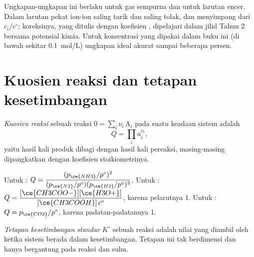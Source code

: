\begin{remark}\label{rem:b1:extent-q-and-k:ideal}
Ungkapan-ungkapan ini berlaku untuk gas sempurna dan untuk larutan encer.
Dalam larutan pekat ion-ion saling tarik dan saling tolak, dan
 menyimpang dari $c_i/c^\circ$; koreksinya, yang ditulis
dengan koefisien , dipelajari dalam jilid Tahun 2 bersama
potensial kimia. Untuk konsentrasi yang dipakai dalam buku ini (di bawah
sekitar \qty{0.1}{mol/L}) ungkapan ideal akurat sampai beberapa persen.
\end{remark}

\section{Kuosien reaksi dan tetapan kesetimbangan}

\begin{definition}\label{def:b1:extent-q-and-k:quotient}
\emph{Kuosien reaksi} sebuah reaksi
$0 = \sum_i \nu_i\,\mathrm{A}_i$ pada suatu keadaan sistem adalah
\[
  Q = \prod_i a_i^{\nu_i} ,
\]
yaitu hasil kali  produk dibagi dengan hasil kali 
pereaksi, masing-masing dipangkatkan dengan koefisien stoikiometrinya.
\end{definition}

\begin{example}\label{ex:b1:extent-q-and-k:quotients}
Untuk : $Q = \dfrac{(p_{\ce{NH3}}/p^\circ)^2}
{(p_{\ce{N2}}/p^\circ)(p_{\ce{H2}}/p^\circ)^3}$. Untuk
: $Q =
\dfrac{[\ce{CH3COO-}][\ce{H3O+}]}{[\ce{CH3COOH}]\,c^\circ}$, karena
 pelarutnya 1. Untuk : $Q =
p_{\ce{CO2}}/p^\circ$, karena  padatan-padatannya 1.
\end{example}

\begin{definition}\label{def:b1:extent-q-and-k:equilibrium-constant}
\emph{Tetapan kesetimbangan standar}
$K^\circ$ sebuah reaksi adalah nilai yang diambil oleh 
ketika sistem berada dalam kesetimbangan. Tetapan ini tak berdimensi dan
hanya bergantung pada reaksi dan suhu.
\end{definition}

